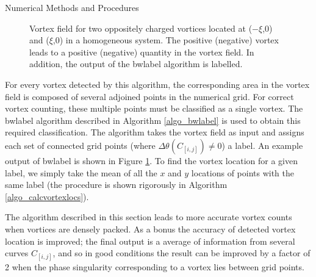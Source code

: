\begin{chapter}{\label{cha:numerics}Numerical Methods and Procedures}
\begin{figure}
\begin{tikzpicture}
  \end{tikzpicture}
  \caption{Vortex field for two oppositely charged vortices located at ($-\xi$,0) and ($\xi$,0) in a homogeneous system. The positive (negative) vortex leads to a positive (negative) quantity in the vortex field. In addition, the output of the bwlabel algorithm is labelled.\label{fig:vortexfield}}
 \end{figure}

For every vortex detected by this algorithm, the corresponding area in the vortex field is composed of several adjoined points in the numerical grid. For correct vortex counting, these multiple points must be classified as a single vortex. The bwlabel algorithm described in Algorithm \ref{algo_bwlabel} is used to obtain this required classification. The algorithm takes the vortex field as input and assigns each set of connected grid points (where $\Delta\theta(C_{[i,j]})\neq 0$) a label. An example output of bwlabel is shown in Figure \ref{fig:vortexfield}. To find the vortex location for a given label, we simply take the mean of all the $x$ and $y$ locations of points with the same label (the procedure is shown rigorously in Algorithm \ref{algo_calcvortexlocs}).

The algorithm described in this section leads to more accurate vortex counts when vortices are densely packed. As a bonus the accuracy of detected vortex location is improved; the final output is a average of information from several curves $C_{[i,j]}$, and so in good conditions the result can be improved by a factor of 2 when the phase singularity corresponding to a vortex lies between grid points.


\end{chapter}
